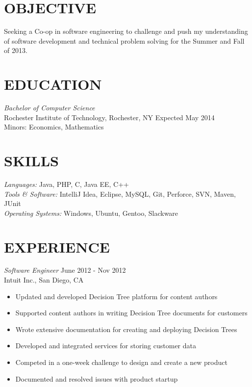 \documentclass[line,margin]{res}
\begin{document}
\address{468 Nathaniel Rochester Hall, Rochester, NY 14623}
\address{kurtz.grant@gmail.com |  (203) 240-7149}

 
\begin{resume}
 
\section{OBJECTIVE}       Seeking a Co-op in software engineering to challenge and push my understanding of software development and 
				technical problem solving for the Summer and Fall of 2013.
 
 
\section{EDUCATION} {\sl Bachelor of Computer Science} \\
	Rochester Institute of Technology, Rochester, NY  \hfill Expected May 2014 \\
	Minors: Economics, Mathematics
	
 
\section{SKILLS} {\sl Languages:} Java, PHP, C, Java EE, C++ \\
		{\sl Tools \& Software:} IntelliJ Idea, Eclipse, MySQL, Git, Perforce, SVN, Maven, JUnit \\
		{\sl Operating Systems:} Windows, Ubuntu, Gentoo, Slackware
 
\section{EXPERIENCE}

	{\sl Software Engineer} \hfill June 2012 - Nov 2012 \\
               Intuit Inc.,  San Diego, CA
                 \begin{itemize}  \itemsep -2pt %
	\item Updated and developed Decision Tree platform for content authors
	\item Supported content authors in writing Decision Tree documents for customers
	\item Wrote extensive documentation for creating and deploying Decision Trees
	\item Developed and integrated services for storing customer data
	\item Competed in a one-week challenge to design and create a new product
	\item Documented and resolved issues with product startup
	\end{itemize}


\end{resume}
\end{document}
